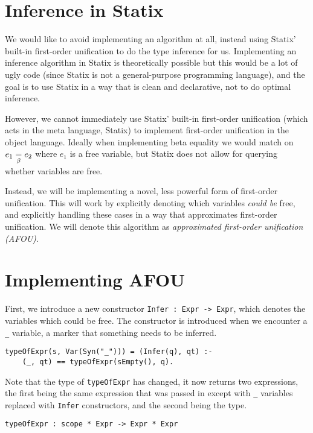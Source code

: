 \section{Inference in Statix}
\label{statix-inference}

We would like to avoid implementing an algorithm at all, instead using Statix' built-in first-order unification to do the type inference for us. Implementing an inference algorithm in Statix is theoretically possible but this would be a lot of ugly code (since Statix is not a general-purpose programming language), and the goal is to use Statix in a way that is clean and declarative, not to do optimal inference.

However, we cannot immediately use Statix' built-in first-order unification (which acts in the meta language, Statix) to implement first-order unification in the object language. Ideally when implementing beta equality we would match on $e_1 \underset{\beta}{=} e_2$ where $e_1$ is a free variable, but Statix does not allow for querying whether variables are free. 

Instead, we will be implementing a novel, less powerful form of first-order unification. This will work by explicitly denoting which variables \emph{could be} free, and explicitly handling these cases in a way that approximates first-order unification. We will denote this algorithm as \emph{approximated first-order unification (AFOU)}.

\section{Implementing AFOU}
\label{implementing-inference}

First, we introduce a new constructor \verb|Infer : Expr -> Expr|, which denotes the variables which could be free. The constructor is introduced when we encounter a \verb|_| variable, a marker that something needs to be inferred.
\begin{lstlisting}
typeOfExpr(s, Var(Syn("_"))) = (Infer(q), qt) :-
	(_, qt) == typeOfExpr(sEmpty(), q).
\end{lstlisting}

Note that the type of \verb|typeOfExpr| has changed, it now returns two expressions, the first being the same expression that was passed in except with \verb|_| variables replaced with \verb|Infer| constructors, and the second being the type.
\begin{lstlisting}
typeOfExpr : scope * Expr -> Expr * Expr
\end{lstlisting}


